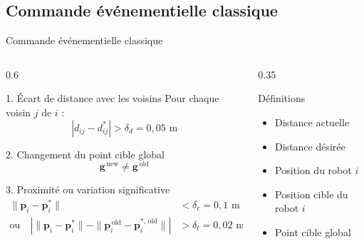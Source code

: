 \subsection{Commande événementielle classique}
\begin{frame}{Commande événementielle classique}
    \begin{columns}
        \begin{column}{0.6\textwidth}
            \begin{block}{1. Écart de distance avec les voisins}
                Pour chaque voisin $j$ de $i$ :
                \begin{equation*}
                    |d_{ij} - d_{ij}^*| > \delta_d = 0{,}05 \text{ m}
                \end{equation*}
            \end{block}
            
            \begin{block}{2. Changement du point cible global}
                \begin{equation*}
                    \mathbf{g}^{\,\text{new}} \neq \mathbf{g}^{\,\text{old}}
                \end{equation*}
            \end{block}
            
            \begin{block}{3. Proximité ou variation significative}
                \begin{align*}
                    \|\mathbf{p}_i - \mathbf{p}_i^*\| &< \delta_c = 0{,}1 \text{ m} \\
                    \text{ou} \quad |\|\mathbf{p}_i - \mathbf{p}_i^*\| - \|\mathbf{p}_i^{\,\text{old}} - \mathbf{p}_i^{*,\,\text{old}}\|| &> \delta_t = 0{,}02 \text{ m}
                \end{align*}
            \end{block}
        \end{column}
        
        \begin{column}{0.35\textwidth}
            \begin{block}{Définitions}
                \begin{itemize}
                    \item[$d_{ij}$] Distance actuelle
                    \item[$d_{ij}^*$] Distance désirée
                    \item[$\mathbf{p}_i$] Position du robot $i$
                    \item[$\mathbf{p}_i^*$] Position cible du robot $i$
                    \item[$\mathbf{g}$] Point cible global
                \end{itemize}
            \end{block}
            

\end{column}
\end{columns}
\end{frame}
